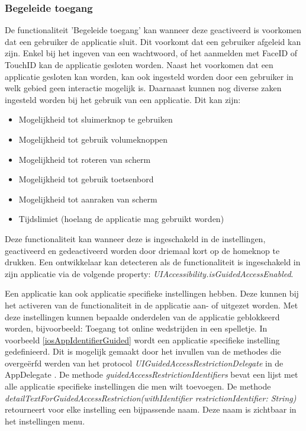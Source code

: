 \subsubsection{Begeleide toegang}
De functionaliteit 'Begeleide toegang' kan wanneer deze geactiveerd is voorkomen dat een gebruiker de applicatie sluit. Dit voorkomt dat een gebruiker afgeleid kan zijn. Enkel bij het ingeven van een wachtwoord, of het aanmelden met FaceID of TouchID kan de applicatie gesloten worden. Naast het voorkomen dat een applicatie gesloten kan worden, kan ook ingesteld worden door een gebruiker in welk gebied geen interactie mogelijk is. Daarnaast kunnen nog diverse zaken ingesteld worden bij het gebruik van een applicatie. Dit kan zijn:
\begin{itemize}
    \item Mogelijkheid tot sluimerknop te gebruiken
    \item Mogelijkheid tot gebruik volumeknoppen
    \item Mogelijkheid tot roteren van scherm
    \item Mogelijkheid tot gebruik toetsenbord
    \item Mogelijkheid tot aanraken van scherm
    \item Tijdslimiet (hoelang de applicatie mag gebruikt worden)
\end{itemize}

Deze functionaliteit kan wanneer deze is ingeschakeld in de instellingen, geactiveerd en gedeactiveerd worden door driemaal kort op de homeknop te drukken. Een ontwikkelaar kan detecteren als de functionaliteit is ingeschakeld in zijn applicatie via de volgende property: \emph{UIAccessibility.isGuidedAccessEnabled}. 



Een applicatie kan ook applicatie specifieke instellingen hebben. Deze kunnen bij het activeren van de functionaliteit in de applicatie aan- of uitgezet worden. Met deze instellingen kunnen bepaalde onderdelen van de applicatie geblokkeerd worden, bijvoorbeeld: Toegang tot online wedstrijden in een spelletje.  In voorbeeld \ref{iosAppIdentifierGuided} wordt een applicatie specifieke instelling gedefinieerd. Dit is mogelijk gemaakt door het invullen van de methodes die  overgeërfd werden van het protocol \emph{UIGuidedAccessRestrictionDelegate} in de AppDelegate . De methode \emph{guidedAccessRestrictionIdentifiers} bevat een lijst met alle applicatie specifieke instellingen die men wilt toevoegen. De methode \emph{detailTextForGuidedAccessRestriction(withIdentifier restrictionIdentifier: String)} retourneert voor elke instelling een bijpassende naam. Deze naam is zichtbaar in het instellingen menu.

